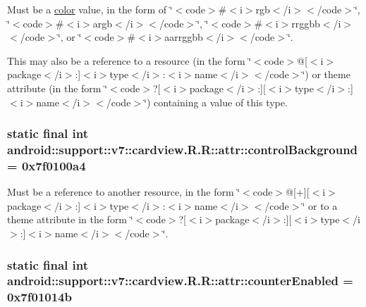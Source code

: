 Must be a \hyperlink{classandroid_1_1support_1_1v7_1_1cardview_1_1_r_1_1color}{color} value, in the form of \char`\"{}$<$code$>$\#$<$i$>$rgb$<$/i$>$$<$/code$>$\char`\"{}, \char`\"{}$<$code$>$\#$<$i$>$argb$<$/i$>$$<$/code$>$\char`\"{}, \char`\"{}$<$code$>$\#$<$i$>$rrggbb$<$/i$>$$<$/code$>$\char`\"{}, or \char`\"{}$<$code$>$\#$<$i$>$aarrggbb$<$/i$>$$<$/code$>$\char`\"{}. 

This may also be a reference to a resource (in the form \char`\"{}$<$code$>$@\mbox{[}$<$i$>$package$<$/i$>$:\mbox{]}$<$i$>$type$<$/i$>$:$<$i$>$name$<$/i$>$$<$/code$>$\char`\"{}) or theme attribute (in the form \char`\"{}$<$code$>$?\mbox{[}$<$i$>$package$<$/i$>$:\mbox{]}\mbox{[}$<$i$>$type$<$/i$>$:\mbox{]}$<$i$>$name$<$/i$>$$<$/code$>$\char`\"{}) containing a value of this type. \hypertarget{classandroid_1_1support_1_1v7_1_1cardview_1_1_r_1_1attr_cc06a9a99f29e5659ac1808aeaaa07da}{
\subsubsection[{controlBackground}]{\setlength{\rightskip}{0pt plus 5cm}static final int android::support::v7::cardview.R.R::attr::controlBackground = 0x7f0100a4}}
\label{classandroid_1_1support_1_1v7_1_1cardview_1_1_r_1_1attr_cc06a9a99f29e5659ac1808aeaaa07da}


Must be a reference to another resource, in the form \char`\"{}$<$code$>$@\mbox{[}+\mbox{]}\mbox{[}$<$i$>$package$<$/i$>$:\mbox{]}$<$i$>$type$<$/i$>$:$<$i$>$name$<$/i$>$$<$/code$>$\char`\"{} or to a theme attribute in the form \char`\"{}$<$code$>$?\mbox{[}$<$i$>$package$<$/i$>$:\mbox{]}\mbox{[}$<$i$>$type$<$/i$>$:\mbox{]}$<$i$>$name$<$/i$>$$<$/code$>$\char`\"{}. \hypertarget{classandroid_1_1support_1_1v7_1_1cardview_1_1_r_1_1attr_03636b0317dfbf55f7eea87606e87683}{
\subsubsection[{counterEnabled}]{\setlength{\rightskip}{0pt plus 5cm}static final int android::support::v7::cardview.R.R::attr::counterEnabled = 0x7f01014b}}
\label{classandroid_1_1support_1_1v7_1_1cardview_1_1_r_1_1attr_03636b0317dfbf55f7eea87606e87683}


